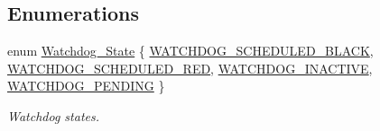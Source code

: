 \subsection*{Enumerations}
\begin{DoxyCompactItemize}
\item 
enum \mbox{\hyperlink{group__RTEMSScoreWatchdog_ga05e885fccc21abb152cc73f29640c679}{Watchdog\+\_\+\+State}} \{ \mbox{\hyperlink{group__RTEMSScoreWatchdog_gga05e885fccc21abb152cc73f29640c679a08893ab5346b6e0b9fe6d3deee186f0a}{W\+A\+T\+C\+H\+D\+O\+G\+\_\+\+S\+C\+H\+E\+D\+U\+L\+E\+D\+\_\+\+B\+L\+A\+CK}}, 
\mbox{\hyperlink{group__RTEMSScoreWatchdog_gga05e885fccc21abb152cc73f29640c679aed543774d49fb22ca9c30127814c6cb2}{W\+A\+T\+C\+H\+D\+O\+G\+\_\+\+S\+C\+H\+E\+D\+U\+L\+E\+D\+\_\+\+R\+ED}}, 
\mbox{\hyperlink{group__RTEMSScoreWatchdog_gga05e885fccc21abb152cc73f29640c679a784972f9f8be675574e6fa14f3dfab08}{W\+A\+T\+C\+H\+D\+O\+G\+\_\+\+I\+N\+A\+C\+T\+I\+VE}}, 
\mbox{\hyperlink{group__RTEMSScoreWatchdog_gga05e885fccc21abb152cc73f29640c679a8f998ebc68aba0a8c14facbb6f25b064}{W\+A\+T\+C\+H\+D\+O\+G\+\_\+\+P\+E\+N\+D\+I\+NG}}
 \}
\begin{DoxyCompactList}\small\item\em Watchdog states. \end{DoxyCompactList}\end{DoxyCompactItemize}
